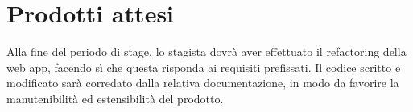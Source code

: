 \section*{Prodotti attesi}
Alla fine del periodo di stage, lo stagista dovrà aver effettuato il refactoring della web app, facendo sì che questa risponda ai requisiti prefissati.
Il codice scritto e modificato sarà corredato dalla relativa documentazione, in modo da favorire
la manutenibilità ed estensibilità del prodotto.
